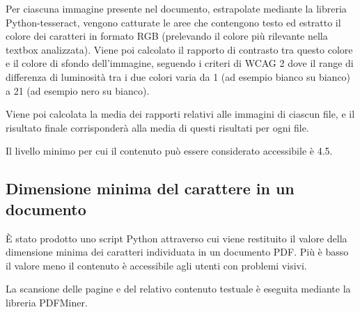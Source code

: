 Per ciascuna immagine presente nel documento, estrapolate mediante la libreria Python-tesseract, vengono catturate le aree che contengono testo ed estratto il colore dei caratteri in formato RGB (prelevando il colore più rilevante nella textbox analizzata). Viene poi calcolato il rapporto di contrasto tra questo colore e il colore di sfondo dell'immagine, seguendo i criteri di WCAG 2 dove il range di differenza di luminosità tra i due colori varia da 1 (ad esempio bianco su bianco) a 21 (ad esempio nero su bianco). 

Viene poi calcolata la media dei rapporti relativi alle immagini di ciascun file, e il risultato finale corrisponderà alla media di questi risultati per ogni file.

Il livello minimo per cui il contenuto può essere considerato accessibile è 4.5.

\subsection{Dimensione minima del carattere in un documento}
È stato prodotto uno script Python attraverso cui viene restituito il valore della dimensione minima dei caratteri individuata in un documento PDF. Più è basso il valore meno il contenuto è accessibile agli utenti con problemi visivi.

La scansione delle pagine e del relativo contenuto testuale è eseguita mediante la libreria PDFMiner.